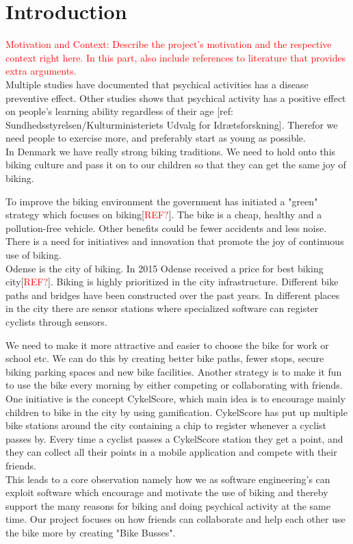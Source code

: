   \section{Introduction}
\textcolor{red}{Motivation and Context: Describe the project’s motivation and the respective context right here. In this part, also include references to literature that provides extra arguments.}\\

\noindent
Multiple studies have documented that psychical activities has a disease preventive effect. Other studies shows that psychical activity has a positive effect on people's learning ability regardless of their age [ref: Sundhedsstyrelsen/Kulturministeriets Udvalg for Idrætsforskning]. Therefor we need people to exercise more, and preferably start as young as possible. \\

\noindent
In Denmark we have really strong biking traditions. We need to hold onto this biking culture and pass it on to our children so that they can get the same joy of biking. 

\noindent
To improve the biking environment the government has initiated a "green" strategy which focuses on biking[\textcolor{red}{REF?}]. The bike is a cheap, healthy and a pollution-free vehicle. Other benefits could be fewer accidents and less noise. There is a need for initiatives and innovation that promote the joy of continuous use of biking. \\

\noindent
Odense is the city of biking. In 2015 Odense received a price for best biking city[\textcolor{red}{REF?}]. Biking is highly prioritized in the city infrastructure. Different bike paths and bridges have been constructed over the past years. In different places in the city there are sensor stations where specialized software can register cyclists through sensors. 

\noindent
We need to make it more attractive and easier to choose the bike for work or school etc. We can do this by creating better bike paths, fewer stops, secure biking parking spaces and new bike facilities. Another strategy is to make it fun to use the bike every morning by either competing or collaborating with friends. \\

\noindent
One initiative is the concept CykelScore, which main idea is to encourage mainly children to bike in the city by using gamification. CykelScore has put up multiple bike stations around the city containing a chip to register whenever a cyclist passes by. Every time a cyclist passes a CykelScore station they get a point, and they can collect all their points in a mobile application and compete with their friends. \\

\noindent
This leads to a core observation namely how we as software engineering's can exploit software which encourage and motivate the use of biking and thereby support the many reasons for biking and doing psychical activity at the same time. 
Our project focuses on how friends can collaborate and help each other use the bike more by creating "Bike Busses".